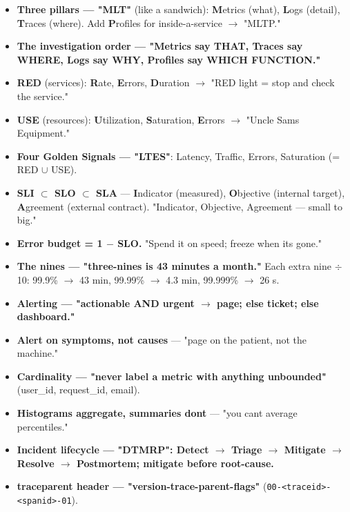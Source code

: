 \documentclass[11pt]{article}
\providecommand{\tightlist}{\setlength{\itemsep}{1pt}\setlength{\parskip}{0pt}}
\begin{document}
\begin{itemize}
\tightlist
\item
  \textbf{Three pillars --- "MLT"} (like a sandwich): \textbf{M}etrics (what), \textbf{L}ogs (detail), \textbf{T}races (where). Add \textbf{P}rofiles for inside-a-service \(\rightarrow\) "MLTP."
\item
  \textbf{The investigation order --- "Metrics say THAT, Traces say WHERE, Logs say WHY, Profiles say WHICH FUNCTION."}
\item
  \textbf{RED} (services): \textbf{R}ate, \textbf{E}rrors, \textbf{D}uration \(\rightarrow\) "RED light = stop and check the service."
\item
  \textbf{USE} (resources): \textbf{U}tilization, \textbf{S}aturation, \textbf{E}rrors \(\rightarrow\) "Uncle Sam\textquotesingle s Equipment."
\item
  \textbf{Four Golden Signals --- "LTES"}: Latency, Traffic, Errors, Saturation (= RED \(\cup\) USE).
\item
  \textbf{SLI \(\subset\) SLO \(\subset\) SLA} --- \textbf{I}ndicator (measured), \textbf{O}bjective (internal target), \textbf{A}greement (external contract). "Indicator, Objective, Agreement --- small to big."
\item
  \textbf{Error budget = 1 \(-\) SLO.} "Spend it on speed; freeze when it\textquotesingle s gone."
\item
  \textbf{The nines --- "three-nines is 43 minutes a month."} Each extra nine \(\div\)10: 99.9\% \(\rightarrow\) 43 min, 99.99\% \(\rightarrow\) 4.3 min, 99.999\% \(\rightarrow\) 26 s.
\item
  \textbf{Alerting --- "actionable AND urgent \(\rightarrow\) page; else ticket; else dashboard."}
\item
  \textbf{Alert on symptoms, not causes} --- "page on the patient, not the machine."
\item
  \textbf{Cardinality --- "never label a metric with anything unbounded"} (user\_id, request\_id, email).
\item
  \textbf{Histograms aggregate, summaries don\textquotesingle t} --- "you can\textquotesingle t average percentiles."
\item
  \textbf{Incident lifecycle --- "DTMRP": Detect \(\rightarrow\) Triage \(\rightarrow\) Mitigate \(\rightarrow\) Resolve \(\rightarrow\) Postmortem; mitigate before root-cause.}
\item
  \textbf{traceparent header --- "version-trace-parent-flags"} (\texttt{00-\textless{}traceid\textgreater{}-\textless{}spanid\textgreater{}-01}).
\end{itemize}
\end{document}
